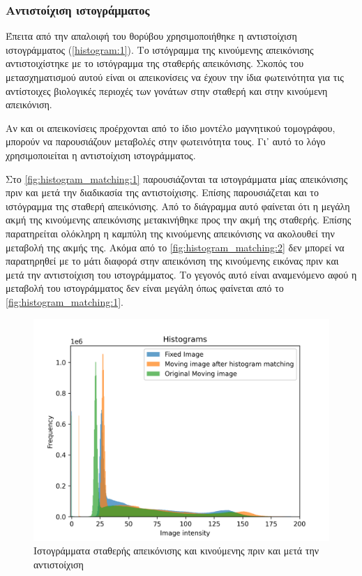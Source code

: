 \documentclass[a4paper,12pt]{article}
\begin{document}
\subsubsection{Αντιστοίχιση ιστογράμματος}

Έπειτα από την απαλοιφή του θορύβου χρησιμοποιήθηκε η αντιστοίχιση ιστογράμματος
(\ref{histogram:1}). Το ιστόγραμμα της κινούμενης απεικόνισης αντιστοιχίστηκε με
το ιστόγραμμα της σταθερής απεικόνισης. Σκοπός του μετασχηματισμού αυτού είναι
οι απεικονίσεις να έχουν την ίδια φωτεινότητα για τις αντίστοιχες βιολογικές
περιοχές των γονάτων στην σταθερή και στην κινούμενη απεικόνιση. 

Αν και οι απεικονίσεις προέρχονται από το ίδιο μοντέλο μαγνητικού τομογράφου,
μπορούν να παρουσιάζουν μεταβολές στην φωτεινότητα τους. Γι᾽ αυτό το λόγο
χρησιμοποιείται η αντιστοίχιση ιστογράμματος.

Στο \autoref{fig:histogram_matching:1} παρουσιάζονται τα ιστογράμματα μίας
απεικόνισης πριν και μετά την διαδικασία της αντιστοίχισης. Επίσης παρουσιάζεται
και το ιστόγραμμα της σταθερή απεικόνισης. Από το διάγραμμα αυτό φαίνεται ότι η
μεγάλη ακμή της κινούμενης απεικόνισης μετακινήθηκε προς την ακμή της σταθερής.
Επίσης παρατηρείται ολόκληρη η καμπύλη της κινούμενης απεικόνισης να ακολουθεί
την μεταβολή της ακμής της. Ακόμα από το \autoref{fig:histogram_matching:2}
δεν μπορεί να παρατηρηθεί με το μάτι διαφορά στην απεικόνιση της κινούμενης
εικόνας πριν και μετά την αντιστοίχιση του ιστογράμματος. Το γεγονός αυτό είναι
αναμενόμενο αφού η μεταβολή του ιστογράμματος δεν είναι μεγάλη όπως φαίνεται από
το \autoref{fig:histogram_matching:1}.


\begin{figure}[H]
    \centering
    \includegraphics[width=\linewidth]{histogram_plot.png}
    \caption{Ιστογράμματα σταθερής απεικόνισης και κινούμενης πριν και μετά την
             αντιστοίχιση}
    \label{fig:histogram_matching:1}
\end{figure}
\end{document}
